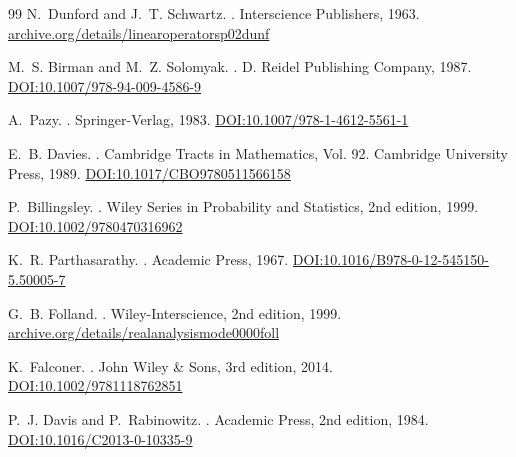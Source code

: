 \documentclass{article}
\numberwithin{equation}{section}
\theoremstyle{plain}
\theoremstyle{definition}
\theoremstyle{remark}
\begin{document}
\begin{thebibliography}{99}
N.~Dunford and J.~T. Schwartz.
.
\newblock Interscience Publishers, 1963.
\href{https://archive.org/details/linearoperatorsp02dunf}{archive.org/details/linearoperatorsp02dunf}

M.~S. Birman and M.~Z. Solomyak.
.
\newblock D. Reidel Publishing Company, 1987.
\href{https://doi.org/10.1007/978-94-009-4586-9}{DOI:10.1007/978-94-009-4586-9}

A.~Pazy.
.
\newblock Springer-Verlag, 1983.
\href{https://doi.org/10.1007/978-1-4612-5561-1}{DOI:10.1007/978-1-4612-5561-1}

E.~B. Davies.
.
\newblock Cambridge Tracts in Mathematics, Vol. 92. Cambridge University Press, 1989.
\href{https://doi.org/10.1017/CBO9780511566158}{DOI:10.1017/CBO9780511566158}

P.~Billingsley.
.
\newblock Wiley Series in Probability and Statistics, 2nd edition, 1999.
\href{https://doi.org/10.1002/9780470316962}{DOI:10.1002/9780470316962}

K.~R. Parthasarathy.
.
\newblock Academic Press, 1967.
\href{https://doi.org/10.1016/B978-0-12-545150-5.50005-7}{DOI:10.1016/B978-0-12-545150-5.50005-7}

G.~B. Folland.
.
\newblock Wiley-Interscience, 2nd edition, 1999.
\href{https://archive.org/details/realanalysismode0000foll}{archive.org/details/realanalysismode0000foll}

K.~Falconer.
.
\newblock John Wiley \& Sons, 3rd edition, 2014.
\href{https://doi.org/10.1002/9781118762851}{DOI:10.1002/9781118762851}

P.~J. Davis and P.~Rabinowitz.
.
\newblock Academic Press, 2nd edition, 1984.
\href{https://doi.org/10.1016/C2013-0-10335-9}{DOI:10.1016/C2013-0-10335-9}


\end{thebibliography}
\end{document}
